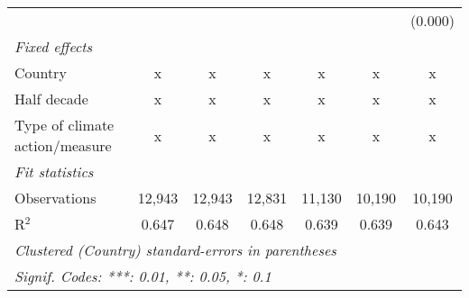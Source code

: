 \begin{tabular}{lcccccc}
                                                          &               &               &               &              &         & (0.000)\\   
   \emph{Fixed effects}\\
   Country                                                & x             & x             & x             & x            & x       & x\\  
   Half decade                                            & x             & x             & x             & x            & x       & x\\  
   Type of climate action/measure                         & x             & x             & x             & x            & x       & x\\  
   \midrule \emph{Fit statistics}\\
   Observations                                           & 12,943        & 12,943        & 12,831        & 11,130       & 10,190  & 10,190\\  
   R$^2$                                                  & 0.647         & 0.648         & 0.648         & 0.639        & 0.639   & 0.643\\  
   \midrule
   \multicolumn{7}{l}{\emph{Clustered (Country) standard-errors in parentheses}}\\
   \multicolumn{7}{l}{\emph{Signif. Codes: ***: 0.01, **: 0.05, *: 0.1}}\\
\end{tabular}
\par\endgroup


